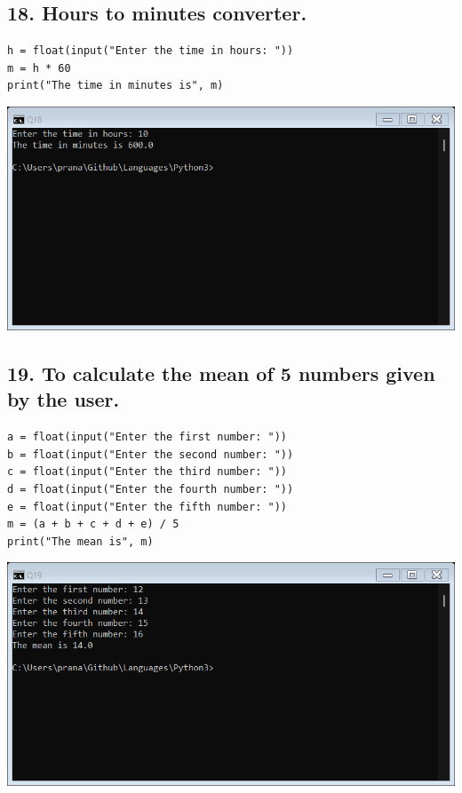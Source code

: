 \documentclass[12pt]{article}
\begin{document}
\subsection*{18. Hours to minutes converter.}
\begin{verbatim}
h = float(input("Enter the time in hours: "))
m = h * 60
print("The time in minutes is", m)
\end{verbatim}
\includegraphics[width=\linewidth]{images/18.png}

\subsection*{19. To calculate the mean of 5 numbers given by the user.}
\begin{verbatim}
a = float(input("Enter the first number: "))
b = float(input("Enter the second number: "))
c = float(input("Enter the third number: "))
d = float(input("Enter the fourth number: "))
e = float(input("Enter the fifth number: "))
m = (a + b + c + d + e) / 5
print("The mean is", m)
\end{verbatim}
\includegraphics[width=\linewidth]{images/19.png}
\end{document}
